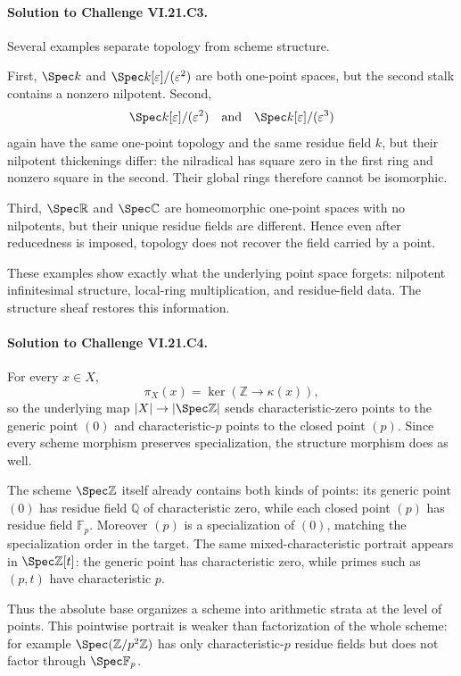 \paragraph{Solution to Challenge VI.21.C3.}
\begin{solution}
Several examples separate topology from scheme structure.

First, $\Spec k$ and $\Spec k[\varepsilon]/(\varepsilon^2)$ are both one-point spaces, but the
second stalk contains a nonzero nilpotent.  Second,
\[
\Spec k[\varepsilon]/(\varepsilon^2)
\quad\text{and}\quad
\Spec k[\varepsilon]/(\varepsilon^3)
\]
again have the same one-point topology and the same residue field $k$, but their nilpotent
thickenings differ: the nilradical has square zero in the first ring and nonzero square in the
second.  Their global rings therefore cannot be isomorphic.

Third, $\Spec\mathbb R$ and $\Spec\mathbb C$ are homeomorphic one-point spaces with no nilpotents,
but their unique residue fields are different.  Hence even after reducedness is imposed, topology
does not recover the field carried by a point.

These examples show exactly what the underlying point space forgets: nilpotent infinitesimal
structure, local-ring multiplication, and residue-field data.  The structure sheaf restores this
information.
\end{solution}

\paragraph{Solution to Challenge VI.21.C4.}
\begin{solution}
For every $x\in X$,
\[
\pi_X(x)=\ker(\mathbb Z\to\kappa(x)),
\]
so the underlying map $|X|\to|\Spec\mathbb Z|$ sends characteristic-zero points to the generic
point $(0)$ and characteristic-$p$ points to the closed point $(p)$.  Since every scheme morphism
preserves specialization, the structure morphism does as well.

The scheme $\Spec\mathbb Z$ itself already contains both kinds of points: its generic point $(0)$
has residue field $\mathbb Q$ of characteristic zero, while each closed point $(p)$ has residue
field $\mathbb F_p$.  Moreover $(p)$ is a specialization of $(0)$, matching the specialization
order in the target.  The same mixed-characteristic portrait appears in
$\Spec\mathbb Z[t]$: the generic point has characteristic zero, while primes such as $(p,t)$ have
characteristic $p$.

Thus the absolute base organizes a scheme into arithmetic strata at the level of points.  This
pointwise portrait is weaker than factorization of the whole scheme: for example
$\Spec(\mathbb Z/p^2\mathbb Z)$ has only characteristic-$p$ residue fields but does not factor
through $\Spec\mathbb F_p$.
\end{solution}

